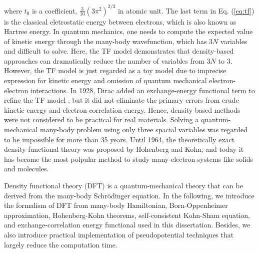 where $t_0$ is a coefficient, $\frac{3}{10}(3\pi^2)^{2/3}$ in atomic unit. The last term in Eq. (\ref{eq:tf}) is the classical eletrostatic energy between electrons, which is also known as Hartree energy. In quantum mechanics, one needs to compute the expected value of kinetic energy through the many-body wavefunction, which has 3$N$ variables and difficult to solve. Here, the TF model demonstrates that density-based approaches can dramatically reduce the number of variables from 3$N$ to 3. However, the TF model is just regarded as a toy model due to imprecise expression for kinetic energy and omission of quantum mechanical electron-electron interactions. In 1928, Dirac added an exchange-energy functional term to refine the TF model \cite{dirac1930note}, but it did not eliminate the primary errors from crude kinetic energy and electron correlation energy. Hence, density-based methods were not considered to be practical for real materials. Solving a quantum-mechanical many-body problem using only three spacial variables was regarded to be impossible for more than 35 years. Until 1964, the theoretically exact density functional theory was proposed by Hohenberg and Kohn, and today it has become the most polpular method to study many-electron systems like solids and molecules.

Density functional theory (DFT) is a quantum-mechanical theory that can be derived from the many-body Schr\"{o}dinger equation. In the following, we introduce the formalism of DFT from many-body Hamiltonian, Born-Oppenheimer approximation, Hohenberg-Kohn theorems, self-consistent Kohn-Sham equation, and exchange-correlation energy functional used in this dissertation. Besides, we also introduce practical implementation of pseudopotential techniques that largely reduce the computation time.

